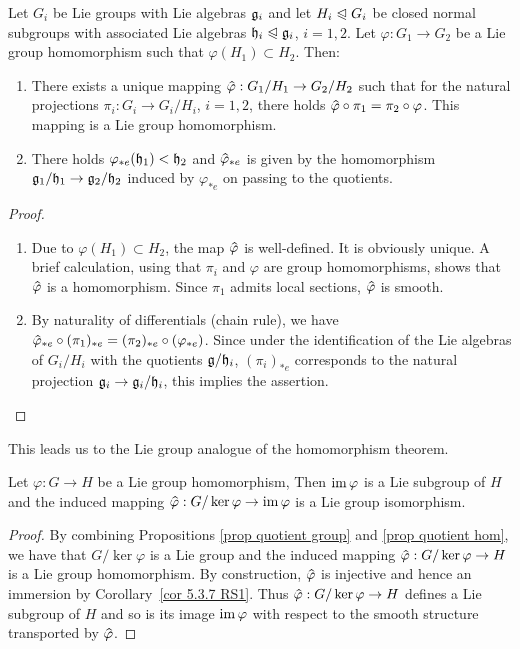 \begin{prop}\label{prop quotient hom}
    Let $G_i$ be Lie groups with Lie algebras $\mathfrak{g}_i$ and let $H_i\trianglelefteqslant G_i$ be closed normal subgroups with associated Lie algebras $\mathfrak{h}_i\trianglelefteqslant \mathfrak{g}_i$, $i=1,2$. Let $\varphi:G_1\to G_2$ be a Lie group homomorphism such that $\varphi(H_1)\subset H_2$. Then:
    \begin{enumerate}
        \item There exists a unique mapping $\wh{\varphi}:G_1\slash H_1\to G_2\slash H_2$ such that for the natural projections $\pi_i:G_i\to G_i\slash H_i$, $i=1,2$, there holds $\wh{\varphi}\circ\pi_1=\pi_2\circ \varphi$. This mapping is a Lie group homomorphism.
        \item There holds $\varphi_{\ast e}(\mathfrak{h}_1)<\mathfrak{h}_2$ and $\wh{\varphi}_{\ast e}$ is given by the homomorphism $\mathfrak{g}_1\slash\mathfrak{h}_1\to \mathfrak{g}_2\slash\mathfrak{h}_2$ induced by $\varphi_{\ast e}$ on passing to the quotients.
    \end{enumerate}
\end{prop}
\begin{proof}
    \begin{enumerate}
        \item Due to $\varphi(H_1)\subset H_2$, the map $\wh{\varphi}$ is well-defined. It is obviously unique. A brief calculation, using that $\pi_i$ and $\varphi$ are group homomorphisms, shows that $\wh{\varphi}$ is a homomorphism. Since $\pi_1$ admits local sections, $\wh{\varphi}$ is smooth.
        \item By naturality of differentials (chain rule), we have $\wh{\varphi}_{\ast e}\circ (\pi_1)_{\ast e}=(\pi_2)_{\ast e}\circ (\varphi_{\ast e})$. Since under the identification of the Lie algebras of $G_i\slash H_i$ with the quotients $\mathfrak{g}\slash \mathfrak{h}_i$, $(\pi_i)_{\ast e}$ corresponds to the natural projection $\mathfrak{g}_i\to \mathfrak{g}_i\slash \mathfrak{h}_i$, this implies the assertion.
    \end{enumerate}
\end{proof}

This leads us to the Lie group analogue of the homomorphism theorem.

\begin{prop}
    Let $\varphi:G\to H$ be a Lie group homomorphism, Then $\operatorname{im}\varphi$ is a Lie subgroup of $H$ and the induced mapping $\wh{\varphi}:G\slash \ker \varphi\to \im\varphi$ is a Lie group isomorphism.
\end{prop}
\begin{proof}
    By combining Propositions \ref{prop quotient group} and \ref{prop quotient hom}, we have that $G\slash \ker\varphi$  is a Lie group and the induced mapping $\wh{\varphi}:G\slash\ker\varphi\to H$ is a Lie group homomorphism. By construction, $\wh\varphi$ is injective and hence an immersion by Corollary~\ref{cor 5.3.7 RS1}. Thus $\wh{\varphi}:G\slash \ker\varphi\to H$ defines a Lie subgroup of $H$ and so is its image $\operatorname{im}\varphi$ with  respect to the smooth structure transported by $\wh{\varphi}$.
\end{proof}

